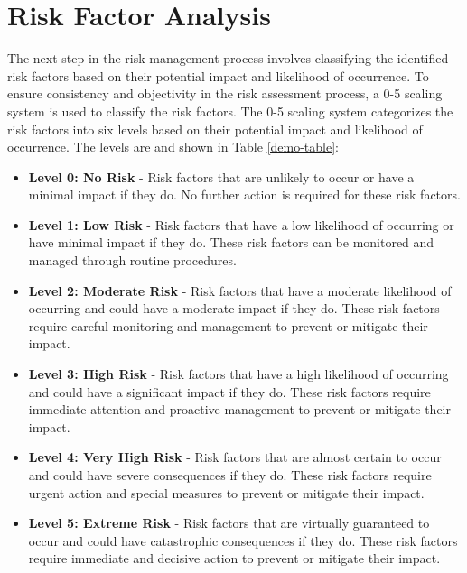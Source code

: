 \documentclass{article}
\begin{document}
\section{Risk Factor Analysis}
The next step in the risk management process involves classifying the identified risk factors based on their potential impact and likelihood of occurrence. To ensure consistency and objectivity in the risk assessment process, a 0-5 scaling system is used to classify the risk factors.
The 0-5 scaling system categorizes the risk factors into six levels based on their potential impact and likelihood of occurrence. The levels are and shown in Table \ref{demo-table}:
\begin{itemize}
  \item \textbf{Level 0: No Risk} - Risk factors that are unlikely to occur or have a minimal impact if they do. No further action is required for these risk factors.
  \item \textbf{Level 1: Low Risk} - Risk factors that have a low likelihood of occurring or have minimal impact if they do. These risk factors can be monitored and managed through routine procedures.
  \item \textbf{Level 2: Moderate Risk} - Risk factors that have a moderate likelihood of occurring and could have a moderate impact if they do. These risk factors require careful monitoring and management to prevent or mitigate their impact.
  \item \textbf{Level 3: High Risk} - Risk factors that have a high likelihood of occurring and could have a significant impact if they do. These risk factors require immediate attention and proactive management to prevent or mitigate their impact.
  \item \textbf{Level 4: Very High Risk} - Risk factors that are almost certain to occur and could have severe consequences if they do. These risk factors require urgent action and special measures to prevent or mitigate their impact.
  \item \textbf{Level 5: Extreme Risk} - Risk factors that are virtually guaranteed to occur and could have catastrophic consequences if they do. These risk factors require immediate and decisive action to prevent or mitigate their impact.
\end{itemize}
\end{document}
